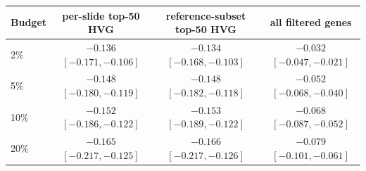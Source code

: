 \begin{tabular}{lccc}
\toprule
Budget & per-slide top-50 HVG & reference-subset top-50 HVG & all filtered genes \\
\midrule
2\% & $-0.136$ $[-0.171, -0.106]$ & $-0.134$ $[-0.168, -0.103]$ & $-0.032$ $[-0.047, -0.021]$ \\
5\% & $-0.148$ $[-0.180, -0.119]$ & $-0.148$ $[-0.182, -0.118]$ & $-0.052$ $[-0.068, -0.040]$ \\
10\% & $-0.152$ $[-0.186, -0.122]$ & $-0.153$ $[-0.189, -0.122]$ & $-0.068$ $[-0.087, -0.052]$ \\
20\% & $-0.165$ $[-0.217, -0.125]$ & $-0.166$ $[-0.217, -0.126]$ & $-0.079$ $[-0.101, -0.061]$ \\
\bottomrule
\end{tabular}
